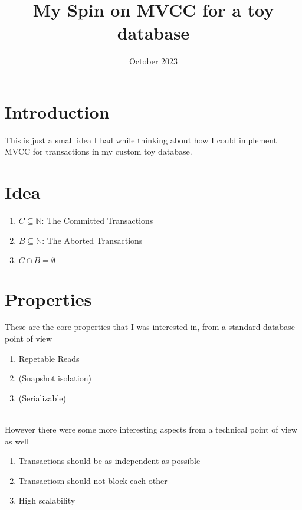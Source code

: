 \documentclass[a4paper, 11pt]{article}
\title{My Spin on MVCC for a toy database}
\date{October 2023}
\begin{document}
\section{Introduction}
This is just a small idea I had while thinking about how I could implement MVCC for transactions in my custom
toy database.

\section{Idea}
\begin{enumerate}
\item $C \subseteq \mathbb{N}$: The Committed Transactions
\item $B \subseteq \mathbb{N}$: The Aborted Transactions
\item $C \cap B = \emptyset$
\end{enumerate}

\section{Properties}
These are the core properties that I was interested in, from a standard database point of view
\begin{enumerate}
\item Repetable Reads
\item (Snapshot isolation)
\item (Serializable)
\end{enumerate} \\
However there were some more interesting aspects from a technical point of view as well
\begin{enumerate}
\item Transactions should be as independent as possible
\item Transactiosn should not block each other
\item High scalability
\end{enumerate}
\end{document}
